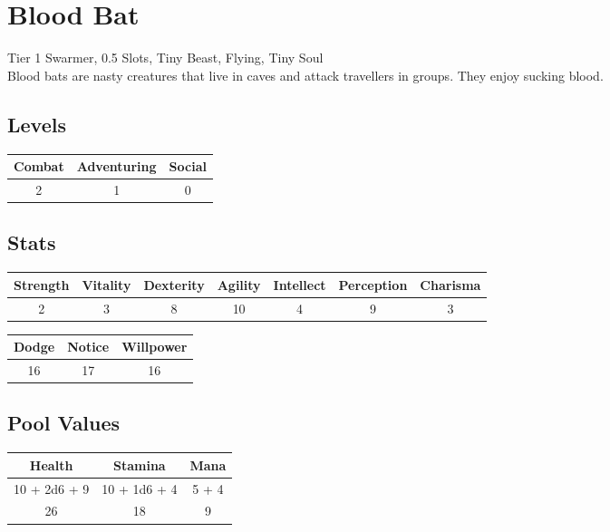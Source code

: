 \section{Blood Bat}\label{sec:bloodbat}
Tier 1 Swarmer, 0.5 Slots, Tiny Beast, Flying, Tiny Soul\\
Blood bats are nasty creatures that live in caves and attack travellers in groups.
They enjoy sucking blood.

\subsection{Levels}
\begin{minipage}[H]{1\textwidth}
	\centering
	\begin{tabular}[c]{|c | c | c|}
		\hline
		Combat & Adventuring & Social\\
		\hline
		2 & 1 & 0\\
		\hline
	\end{tabular}
\end{minipage}

\subsection{Stats}
\begin{minipage}[H]{1\textwidth}
	\centering
	\begin{tabular}[c]{|c | c | c | c | c | c | c|}
		\hline
		Strength & Vitality & Dexterity & Agility & Intellect & Perception & Charisma\\
		\hline
		2 & 3 & 8 & 10 & 4 & 9 & 3\\
		\hline
	\end{tabular}
\end{minipage}
\bigbreak

\begin{minipage}[H]{1\textwidth}
	\centering
	\begin{tabular}[c]{|c | c | c|}
		\hline
		Dodge & Notice & Willpower\\
		\hline
		16 & 17 & 16\\
		\hline
	\end{tabular}
\end{minipage}

\subsection{Pool Values}
\begin{minipage}[H]{1\textwidth}
	\centering
	\begin{tabular}[c]{|c | c | c|}
		\hline
		Health & Stamina & Mana\\
		\hline
		10 + 2d6 + 9 & 10 + 1d6 + 4 & 5 + 4 \\
		26 & 18 & 9\\
		\hline
	\end{tabular}
\end{minipage}
\noindent

